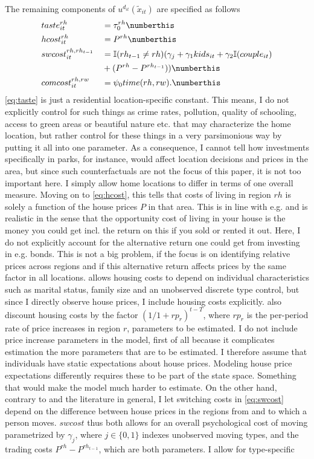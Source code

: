 The remaining components of $u^{d_{it}}(\tilde{x}_{it})$ are specified as follows
\begin{alignat*}{3}
& taste_{it}^{rh} &&= \tau_0^{rh} \label{eq:taste} \numberthis \\
& hcost_{it}^{rh} &&= P^{rh} \label{eq:hcost} \numberthis \\
& swcost_{it}^{rh,rh_{t-1}} &&= \mathbb{I}{(rh_{t-1} \neq rh)}  (\gamma_{j}+ \gamma_1 kids_{it} + \gamma_2 \mathbb{I}{(couple_{it})} \\
& &&+(P^{rh}-P^{rh_{t-1}} ) )  \label{eq:swcost} \numberthis \\
& comcost_{it}^{rh,rw} &&=\psi_0 time(rh,rw). \label{eq:trans} \numberthis
\end{alignat*}
\eqref{eq:taste} is just a residential location-specific constant. This means, I do not explicitly control for such things as crime rates, pollution, quality of schooling, access to green areas or beautiful nature etc. that may characterize the home location, but rather control for these things in a very parsimonious way by putting it all into one parameter. As a consequence, I cannot tell how investments specifically in parks, for instance, would affect location decisions and prices in the area, but since such counterfactuals are not the focus of this paper, it is not too important here. I simply allow home locations to differ in terms of one overall measure. Moving on to \eqref{eq:hcost}, this tells that costs of living in region $rh$ is solely a function of the house prices $P$ in that area. This is in line with e.g. \citet{Oswald2015} and is realistic in the sense that the opportunity cost of living in your house is the money you could get incl. the return on this if you sold or rented it out. Here, I do not explicitly account for the alternative return one could get from investing in e.g. bonds. This is not a big problem, if the focus is on identifying relative prices across regions and if this alternative return affects prices by the same  factor in all locations. \citet{Buchinsky2014} allows housing costs to depend on individual characteristics such as marital status, family size and an unobserved discrete type control, but since I directly observe house prices, I include housing costs explicitly. \citet{Buchinsky2014} also discount housing costs by the factor $(1/1+rp_r)^{t-T}$, where $rp_r$ is the per-period rate of price increases in region $r$, parameters to be estimated. I do not include price increase parameters in the model, first of all because it complicates estimation the more parameters that are to be estimated. I therefore assume that individuals have static expectations about house prices. Modeling house price expectations differently requires these to be part of the state space. Something that would make the model much harder to estimate. On the other hand, contrary to \citet{Buchinsky2014} and the literature in general, I let switching costs in \eqref{eq:swcost} depend on the difference between house prices in the regions from and to which a person moves. $swcost$ thus both allows for an overall psychological cost of moving parametrized by $\gamma_{j}$, where $j\in\{0,1\}$ indexes unobserved moving types, and the trading costs $P^{rh}-P^{rh_{t-1}}$, which are both parameters. I allow for type-specific 